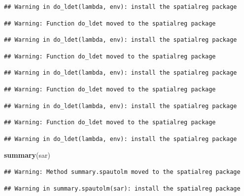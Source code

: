 \documentclass[11pt,]{article}
\newenvironment{Shaded}{\begin{snugshade}}{\end{snugshade}}
\newcommand{\KeywordTok}[1]{\textcolor[rgb]{0.13,0.29,0.53}{\textbf{#1}}}
\newcommand{\NormalTok}[1]{#1}
\begin{document}
\begin{verbatim}
## Warning in do_ldet(lambda, env): install the spatialreg package
\end{verbatim}

\begin{verbatim}
## Warning: Function do_ldet moved to the spatialreg package
\end{verbatim}

\begin{verbatim}
## Warning in do_ldet(lambda, env): install the spatialreg package
\end{verbatim}

\begin{verbatim}
## Warning: Function do_ldet moved to the spatialreg package
\end{verbatim}

\begin{verbatim}
## Warning in do_ldet(lambda, env): install the spatialreg package
\end{verbatim}

\begin{verbatim}
## Warning: Function do_ldet moved to the spatialreg package
\end{verbatim}

\begin{verbatim}
## Warning in do_ldet(lambda, env): install the spatialreg package
\end{verbatim}

\begin{verbatim}
## Warning: Function do_ldet moved to the spatialreg package
\end{verbatim}

\begin{verbatim}
## Warning in do_ldet(lambda, env): install the spatialreg package
\end{verbatim}

\begin{Shaded}
\begin{Highlighting}[]
\KeywordTok{summary}\NormalTok{(sar)}
\end{Highlighting}
\end{Shaded}

\begin{verbatim}
## Warning: Method summary.spautolm moved to the spatialreg package
\end{verbatim}

\begin{verbatim}
## Warning in summary.spautolm(sar): install the spatialreg package
\end{verbatim}
\end{document}
